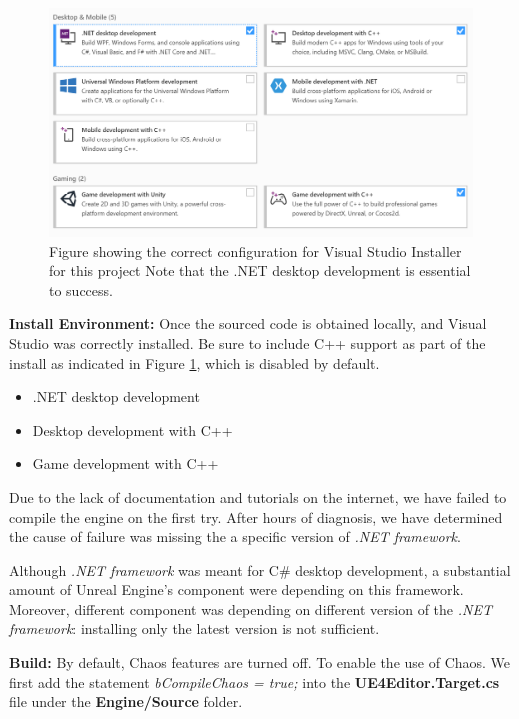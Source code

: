 \documentclass[sigconf]{acmart}
\begin{document}
\begin{figure}[ht]
  \centering
  \includegraphics[width=\linewidth]{aaafiles/enviroment.png}
  \caption{Figure showing the correct configuration for Visual Studio Installer for this project Note that the .NET desktop development is essential to success. }
  \label{fig:visual_studio}
\end{figure}

\textbf{Install Environment:} Once the sourced code is obtained locally, and Visual Studio was correctly installed. Be sure to include C++ support as part of the install as indicated in Figure \ref{fig:visual_studio}, which is disabled by default. 

\begin{itemize}
    \item .NET desktop development
    \item Desktop development with C++
    \item Game development with C++
\end{itemize}

Due to the lack of documentation and tutorials on the internet, we have failed to compile the engine on the first try. After hours of diagnosis, we have determined the cause of failure was missing the a specific version of \textit{.NET framework}. 

Although \textit{.NET framework} was meant for C\# desktop development, a substantial amount of Unreal Engine's component were depending on this framework. Moreover, different component was depending on different version of the \textit{.NET framework}: installing only the latest version is not sufficient. 

\vspace{5mm}

\textbf{Build:} By default, Chaos features are turned off. To enable the use of Chaos. We first add the statement \textit{bCompileChaos = true;} into the \textbf{UE4Editor.Target.cs} file under the \textbf{Engine/Source} folder. 
\end{document}
